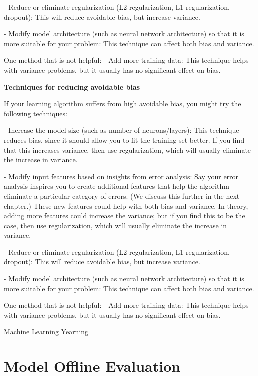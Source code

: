 \documentclass[openany]{book}
\begin{document}
- Reduce or eliminate regularization (L2 regularization, L1 regularization, dropout): This will reduce avoidable bias, but increase variance.

- Modify model architecture (such as neural network architecture) so that it is more suitable for your problem: This technique can affect both bias and variance.

One method that is not helpful:
- Add more training data: This technique helps with variance problems, but it usually has no significant effect on bias.


\textbf{Techniques for reducing avoidable bias
}

If your learning algorithm suffers from high avoidable bias, you might try the following techniques:

- Increase the model size (such as number of neurons/layers): This technique reduces bias, since it should allow you to fit the training set better. If you find that this increases variance, then use regularization, which will usually eliminate the increase in variance.

- Modify input features based on insights from error analysis: Say your error analysis inspires you to create additional features that help the algorithm eliminate a particular category of errors. (We discuss this further in the next chapter.) These new features could help with both bias and variance. In theory, adding more features could increase the variance; but if you find this to be the case, then use regularization, which will usually eliminate the increase in variance.

- Reduce or eliminate regularization (L2 regularization, L1 regularization, dropout): This will reduce avoidable bias, but increase variance.

- Modify model architecture (such as neural network architecture) so that it is more suitable for your problem: This technique can affect both bias and variance.

One method that is not helpful:
- Add more training data: This technique helps with variance problems, but it usually has no significant effect on bias.

\href{https://nessie.ilab.sztaki.hu/~kornai/2020/AdvancedMachineLearning/Ng_MachineLearningYearning.pdf
}{Machine Learning Yearning 
}

\section{Model Offline Evaluation}
\end{document}
